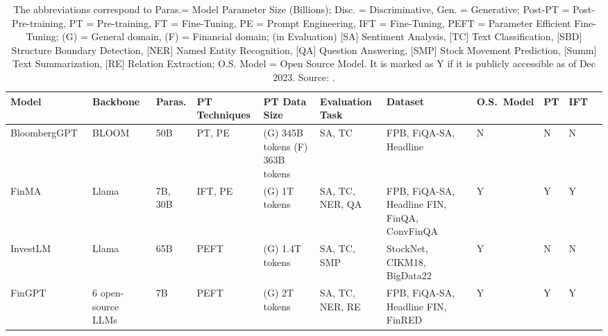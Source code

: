 \begin{table}[!h]
	\scriptsize
	\centering
	\begin{tabularx}{\textwidth}{@{}lp{1.5cm}p{1cm}p{1cm}p{1.5cm}p{1.5cm}p{1.5cm}p{1cm}p{1cm}p{1cm}p{1cm}@{}}
		\toprule
		Model                                  & Backbone           & Paras.  & PT Techniques & PT \newline Data Size                    & Evaluation \newline Task & Dataset                                               & O.S.\ Model & PT & IFT \\
		\midrule
		BloombergGPT~\cite{wu2023bloomberggpt} & BLOOM              & 50B     & PT, PE        & (G) 345B tokens \newline (F) 363B tokens & SA, TC                   & FPB, FiQA-SA, Headline                                & N           & N  & N   \\
		FinMA~\cite{xie2023pixiu}              & Llama              & 7B, 30B & IFT, PE       & (G) 1T tokens                            & SA, TC, NER, QA          & FPB, FiQA-SA, Headline \newline FIN, FinQA, ConvFinQA & Y           & Y  & Y   \\
		InvestLM~\cite{yang2023investlm}       & Llama              & 65B     & PEFT          & (G) 1.4T tokens                          & SA, TC, SMP              & StockNet, CIKM18, BigData22                           & Y           & N  & N   \\
		FinGPT~\cite{wang2023fingpt}           & 6 open-source LLMs & 7B      & PEFT          & (G) 2T tokens                            & SA, TC, NER, RE          & FPB, FiQA-SA, Headline \newline FIN, FinRED           & Y           & Y  & Y   \\
		\bottomrule
	\end{tabularx}
	\caption{The abbreviations correspond to Paras.= Model Parameter Size (Billions); Disc. = Discriminative, Gen. = Generative; Post-PT = Post-Pre-training, PT = Pre-training, FT = Fine-Tuning, PE = Prompt Engineering, IFT = Fine-Tuning, PEFT = Parameter Efficient Fine-Tuning; (G) = General domain, (F) = Financial domain; (in Evaluation) [SA] Sentiment Analysis, [TC] Text Classification, [SBD] Structure Boundary Detection, [NER] Named Entity Recognition, [QA] Question Answering, [SMP] Stock Movement Prediction, [Summ] Text Summarization, [RE] Relation Extraction; O.S. Model = Open Source Model. It is marked as Y if it is publicly accessible as of Dec 2023. Source: \textcite{lee2024survey}.}
	\label{tab:fin_llms}
\end{table}


